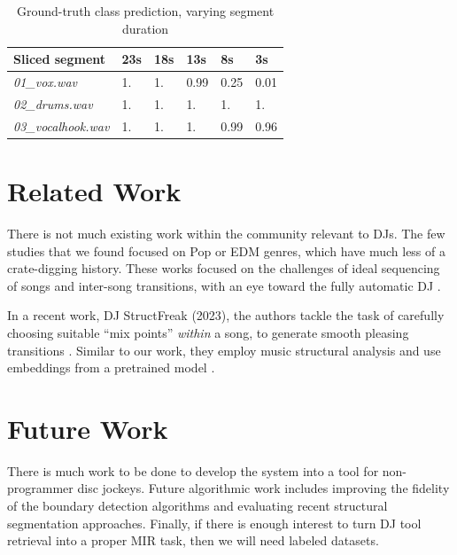 \documentclass{article}
\begin{document}
\begin{table}
 \begin{center}
 \begin{tabular}{llllll}
    \toprule
 	  Sliced segment & 23s & 18s & 13s & 8s & 3s \\
 	\midrule
	\textit{01\_vox.wav} & 1. & 1. & 0.99 & 0.25 & 0.01 \\
	\textit{02\_drums.wav} & 1. & 1. & 1. & 1. & 1. \\
	\textit{03\_vocalhook.wav} & 1. & 1. & 1. & 0.99 & 0.96\\
	\end{tabular}
\end{center}
 \caption{Ground-truth class prediction, varying segment duration}
 \label{tab:vox_class_ablation}
\end{table}

\section{Related Work}
There is not much existing work within the community relevant to DJs. The few studies that we found focused on Pop or EDM genres, which have much less of a crate-digging history. These works focused on the challenges of ideal sequencing of songs and inter-song transitions, with an eye toward the fully automatic DJ \cite{kim2017automatic, huang2017djnet, bittner2017automatic}.

In a recent work, DJ StructFreak (2023), the authors tackle the task of carefully choosing suitable ``mix points'' \textit{within} a song, to generate smooth pleasing transitions \cite{kim2023dj}. Similar to our work, they employ music structural analysis and use embeddings from a pretrained model \cite{kim2023all}. 

\section{Future Work}
There is much work to be done to develop the system into a tool for non-programmer disc jockeys. Future algorithmic work includes improving the fidelity of the boundary detection algorithms and evaluating recent structural segmentation approaches\cite{kim2023all}. Finally, if there is enough interest to turn DJ tool retrieval into a proper MIR task, then we will need labeled datasets. 

\end{document}
